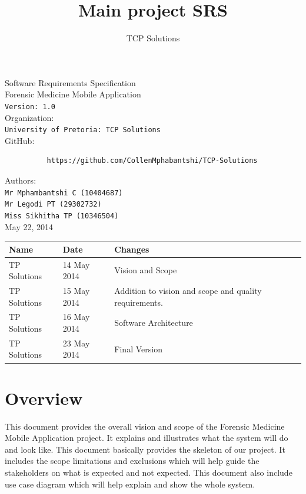 \documentclass[10pt,a4paper]{article}
\author{TCP Solutions}
\title{Main project SRS}
\begin{document}
\begin{titlepage}
\begin{center}

\huge Software Requirements Specification\\[0.15cm]
\huge Forensic Medicine Mobile Application\\[0.15cm]
\large \texttt{Version: 1.0}\\[1cm]

Organization:\\
\texttt{University of Pretoria: TCP Solutions}\\[0.5cm]
GitHub:\\[0.01cm]

\begin{verbatim}
          https://github.com/CollenMphabantshi/TCP-Solutions
\end{verbatim}

Authors:\\
\texttt{Mr Mphambantshi C (10404687)\\
        Mr Legodi PT (29302732)\\
        Miss Sikhitha TP  (10346504)}\\[1cm]
        
May 22, 2014

\begin{tabular}{|l|l|l|}\hline
Name   & Date	& Changes	\\\hline
TP Solutions	& 14 May 2014	& Vision and Scope\\\hline
TP Solutions	& 15 May 2014	& Addition to vision and scope and quality requirements.\\\hline
TP Solutions	& 16 May 2014	& Software Architecture\\\hline
TP Solutions	& 23 May 2014	& Final Version\\\hline
\end{tabular}

\end{center}
\end{titlepage}


\tableofcontents
\pagebreak
\section{Overview}
This document provides the overall vision and scope of the Forensic Medicine Mobile Application project. It explains and illustrates what the system will do and look like. This document basically provides the skeleton of our project. It includes the scope limitations and exclusions which will help guide the stakeholders on what is expected and not expected. This document also include use case diagram which will help explain and show the whole system.
\end{document}

